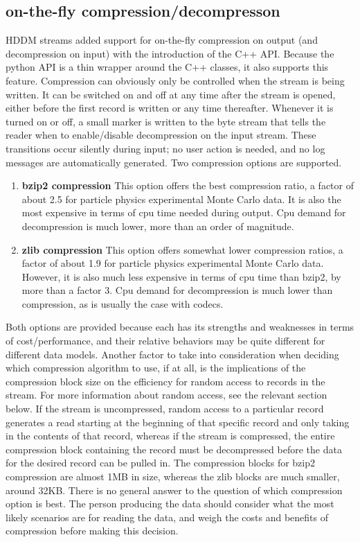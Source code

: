 \documentclass{revtex4}
\begin{document}
\subsection{on-{}the-{}fly compression/decompresson}

HDDM streams added support for on-{}the-{}fly compression on output (and 
decompression on input) with the introduction of the C++ API. Because the 
python API is a thin wrapper around the C++ classes, it also supports this
feature. Compression can obviously only be controlled when the stream is
being written. It can be switched on and off at any time after the stream
is opened, either before the first record is written or any time thereafter.
Whenever it is turned on or off, a small marker is written to the byte
stream that tells the reader when to enable/disable decompression on the
input stream. These transitions occur silently during input; no user
action is needed, and no log messages are automatically generated. Two
compression options are supported.

\begin{enumerate}
\item{\bf bzip2 compression}
This option offers the best compression ratio, a factor of about 2.5 for
particle physics experimental Monte Carlo data. It is also the most 
expensive in terms of cpu time needed during output. Cpu demand for
decompression is much lower, more than an order of magnitude.
\item{\bf zlib compression}
This option offers somewhat lower compression ratios, a factor of about 
1.9 for particle physics experimental Monte Carlo data. However, it is
also much less expensive in terms of cpu time than bzip2, by more than
a factor 3. Cpu demand for decompression is much lower than compression,
as is usually the case with codecs.
\end{enumerate}

Both options are provided because each has its strengths and weaknesses
in terms of cost/performance, and their relative behaviors may be quite
different for different data models. Another factor to take into 
consideration when deciding which compression algorithm to use, if at all,
is the implications of the compression block size on the efficiency for
random access to records in the stream. For more information about random
access, see the relevant section below. If the stream is uncompressed,
random access to a particular record generates a read starting at the
beginning of that specific record and only taking in the contents of 
that record, whereas if the stream is compressed, the entire compression
block containing the record must be decompressed before the data for the
desired record can be pulled in. The compression blocks for bzip2 
compression are almost 1MB in size, whereas the zlib blocks are much
smaller, around 32KB. There is no general answer to the question of which
compression option is best. The person producing the data should consider
what the most likely scenarios are for reading the data, and weigh the
costs and benefits of compression before making this decision.
\end{document}
